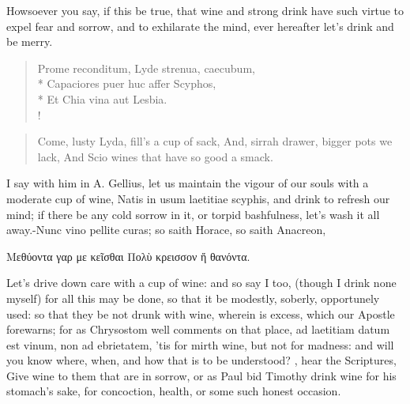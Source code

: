 Howsoever you say, if this be true, that wine and strong drink have
such virtue to expel fear and sorrow, and to exhilarate the mind, ever
hereafter let's drink and be merry.
%
%
\begin{latin}%
\begin{verse}%
Prome reconditum, Lyde strenua, caecubum,\\*
Capaciores puer huc affer Scyphos,\\*
Et Chia vina aut Lesbia.\\!
\end{verse}%
\end{latin}%
\translationrule%
\begin{verse}%
Come, lusty Lyda, fill's a cup of sack,
And, sirrah drawer, bigger pots we lack,
And Scio wines that have so good a smack.
\end{verse}%
%
I say with him in A. Gellius, let us maintain the vigour of our
souls with a moderate cup of wine, Natis in usum laetitiae
scyphis, and drink to refresh our mind; if there be any cold sorrow in
it, or torpid bashfulness, let's wash it all away.-Nunc vino pellite
curas; so saith Horace, so saith Anacreon,

\textgreek[variant=ancient]{Μεθύοντα γαρ με κεῖσθαι
Πολὺ κρεισσον ἤ θανόντα.}

Let's drive down care with a cup of wine: and so say I too, (though I
drink none myself) for all this may be done, so that it be modestly,
soberly, opportunely used: so that they be not drunk with wine, wherein
is excess, which our Apostle forewarns; for as Chrysostom well
comments on that place, ad laetitiam datum est vinum, non ad
ebrietatem, 'tis for mirth wine, but not for madness: and will you know
where, when, and how that is to be understood? , hear the Scriptures, Give wine to
them that are in sorrow, or as Paul bid Timothy drink wine for his
stomach's sake, for concoction, health, or some such honest occasion.

